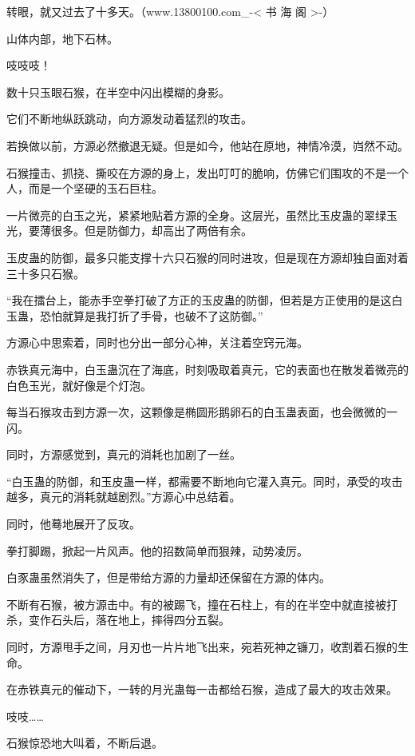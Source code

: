 
\begin{this_body}

转眼，就又过去了十多天。（www.13800100.com\_-< 书 海 阁 >-）

山体内部，地下石林。

吱吱吱！

数十只玉眼石猴，在半空中闪出模糊的身影。

它们不断地纵跃跳动，向方源发动着猛烈的攻击。

若换做以前，方源必然撤退无疑。但是如今，他站在原地，神情冷漠，岿然不动。

石猴撞击、抓挠、撕咬在方源的身上，发出叮叮的脆响，仿佛它们围攻的不是一个人，而是一个坚硬的玉石巨柱。

一片微亮的白玉之光，紧紧地贴着方源的全身。这层光，虽然比玉皮蛊的翠绿玉光，要薄很多。但是防御力，却高出了两倍有余。

玉皮蛊的防御，最多只能支撑十六只石猴的同时进攻，但是现在方源却独自面对着三十多只石猴。

“我在擂台上，能赤手空拳打破了方正的玉皮蛊的防御，但若是方正使用的是这白玉蛊，恐怕就算是我打折了手骨，也破不了这防御。”

方源心中思索着，同时也分出一部分心神，关注着空窍元海。

赤铁真元海中，白玉蛊沉在了海底，时刻吸取着真元，它的表面也在散发着微亮的白色玉光，就好像是个灯泡。

每当石猴攻击到方源一次，这颗像是椭圆形鹅卵石的白玉蛊表面，也会微微的一闪。

同时，方源感觉到，真元的消耗也加剧了一丝。

“白玉蛊的防御，和玉皮蛊一样，都需要不断地向它灌入真元。同时，承受的攻击越多，真元的消耗就越剧烈。”方源心中总结着。

同时，他蓦地展开了反攻。

拳打脚踢，掀起一片风声。他的招数简单而狠辣，动势凌厉。

白豕蛊虽然消失了，但是带给方源的力量却还保留在方源的体内。

不断有石猴，被方源击中。有的被踢飞，撞在石柱上，有的在半空中就直接被打杀，变作石头后，落在地上，摔得四分五裂。

同时，方源甩手之间，月刃也一片片地飞出来，宛若死神之镰刀，收割着石猴的生命。

在赤铁真元的催动下，一转的月光蛊每一击都给石猴，造成了最大的攻击效果。

吱吱……

石猴惊恐地大叫着，不断后退。


\end{this_body}
